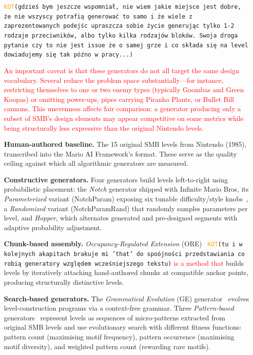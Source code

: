 \documentclass[shortabstract, mgr, english]{iithesis}
\newcommand{\DEBUG}[1]{{#1}} %
\newcommand{\KOT}[1]{\DEBUG{\tt{\textcolor{orange}{KOT}(}{#1}{)}}}
\newcommand{\changed}[1]{\textcolor{red}{#1}}
\begin{document}
\KOT{gdzieś bym jeszcze wspomniał, nie wiem jakie miejsce jest dobre, że nie wszyscy potrafią generować to samo i że wiele z zaprezentowanych podejśc upraszcza sobie życie generując tylko 1-2 rodzaje przeciwników, albo tylko kilka rodzajów bloków. Swoja droga pytanie czy to nie jest issue że o samej grze i co składa się na level dowiadujemy się tak późno w pracy...}

\changed{An important caveat is that these generators do not all target the
same design vocabulary. Several reduce the problem space substantially---for
instance, restricting themselves to one or two enemy types (typically Goombas
and Green Koopas) or omitting power-ups, pipes carrying Piranha Plants, or
Bullet Bill cannons. This unevenness affects fair comparison: a generator
producing only a subset of SMB's design elements may appear competitive on
some metrics while being structurally less expressive than the original
Nintendo levels.}

\textbf{Human-authored baseline.} The 15 original SMB levels from Nintendo
(1985), transcribed into the Mario AI Framework's format. These serve as the
quality ceiling against which all algorithmic generators are measured.

\textbf{Constructive generators.} Four generators build levels left-to-right
using probabilistic placement: the \emph{Notch} generator shipped with Infinite
Mario Bros, its \emph{Parameterized} variant (NotchParam) exposing six tunable
difficulty/style knobs~\citep{shaker2011mario}, a \emph{Randomized} variant
(NotchParamRand) that randomly samples parameters per level, and \emph{Hopper},
which alternates generated and pre-designed segments with adaptive probability
adjustment.

\textbf{Chunk-based assembly.} \emph{Occupancy-Regulated Extension}
(ORE)~\citep{mawhorter2010occupancy} \KOT{tu i w kolejnych akapitach brakuje mi 'that' do spoójności przedstawiania co robią generatory względem wcześniejszego tekstu} \changed{is a method that} builds levels by iteratively attaching
hand-authored chunks at compatible anchor points, producing structurally
distinctive levels.

\textbf{Search-based generators.} The \emph{Grammatical Evolution} (GE)
generator~\citep{shaker2012evolving} evolves level-construction programs via a
context-free grammar. Three \emph{Pattern-based}
generators~\citep{dahlskog2014procedural} represent levels as sequences of
micro-patterns extracted from original SMB levels and use evolutionary search
with different fitness functions: pattern count (maximising motif frequency),
pattern occurrence (maximising motif diversity), and weighted pattern count
(rewarding rare motifs).
\end{document}

